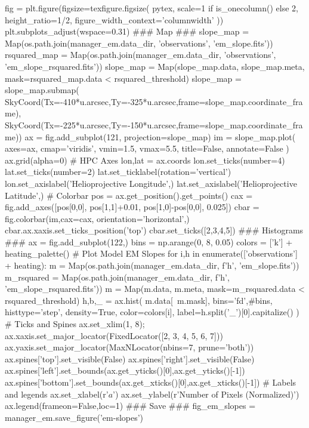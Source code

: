 \begin{pycode}[manager_em]
fig = plt.figure(figsize=texfigure.figsize(
    pytex,
    scale=1 if is_onecolumn() else 2,
    height_ratio=1/2,
    figure_width_context='columnwidth'
))
plt.subplots_adjust(wspace=0.31)
### Map ###
slope_map = Map(os.path.join(manager_em.data_dir, 'observations', 'em_slope.fits'))
rsquared_map = Map(os.path.join(manager_em.data_dir, 'observations', 'em_slope_rsquared.fits'))
slope_map = Map(slope_map.data, slope_map.meta, mask=rsquared_map.data < rsquared_threshold)
slope_map = slope_map.submap(
    SkyCoord(Tx=-410*u.arcsec,Ty=-325*u.arcsec,frame=slope_map.coordinate_frame),
    SkyCoord(Tx=-225*u.arcsec,Ty=-150*u.arcsec,frame=slope_map.coordinate_frame))
ax = fig.add_subplot(121, projection=slope_map)
im = slope_map.plot(
    axes=ax,
    cmap='viridis',
    vmin=1.5,
    vmax=5.5,
    title=False,
    annotate=False
)
ax.grid(alpha=0)
# HPC Axes
lon,lat = ax.coords
lon.set_ticks(number=4)
lat.set_ticks(number=2)
lat.set_ticklabel(rotation='vertical')
lon.set_axislabel('Helioprojective Longitude',)
lat.set_axislabel('Helioprojective Latitude',)
# Colorbar
pos = ax.get_position().get_points()
cax = fig.add_axes([pos[0,0], pos[1,1]+0.01, pos[1,0]-pos[0,0], 0.025])
cbar = fig.colorbar(im,cax=cax, orientation='horizontal',)
cbar.ax.xaxis.set_ticks_position('top')
cbar.set_ticks([2,3,4,5])
### Histograms ###
ax = fig.add_subplot(122,)
bins = np.arange(0, 8, 0.05)
colors = ['k'] + heating_palette()
# Plot Model EM Slopes
for i,h in enumerate(['observations'] + heating):
    m = Map(os.path.join(manager_em.data_dir, f'{h}', 'em_slope.fits'))
    m_rsquared = Map(os.path.join(manager_em.data_dir, f'{h}', 'em_slope_rsquared.fits'))
    m = Map(m.data, m.meta, mask=m_rsquared.data < rsquared_threshold)
    h,b,_ = ax.hist(
        m.data[~m.mask],
        bins='fd',#bins,
        histtype='step',
        density=True,
        color=colors[i],
        label=h.split('_')[0].capitalize()
    )
# Ticks and Spines
ax.set_xlim(1, 8);
ax.xaxis.set_major_locator(FixedLocator([2, 3, 4, 5, 6, 7]))
ax.yaxis.set_major_locator(MaxNLocator(nbins=7, prune='both'))
ax.spines['top'].set_visible(False)
ax.spines['right'].set_visible(False)
ax.spines['left'].set_bounds(ax.get_yticks()[0],ax.get_yticks()[-1])
ax.spines['bottom'].set_bounds(ax.get_xticks()[0],ax.get_xticks()[-1])
# Labels and legends
ax.set_xlabel(r'$a$')
ax.set_ylabel(r'Number of Pixels (Normalized)')
ax.legend(frameon=False,loc=1)
### Save ###
fig_em_slopes = manager_em.save_figure('em-slopes')

\end{pycode}

